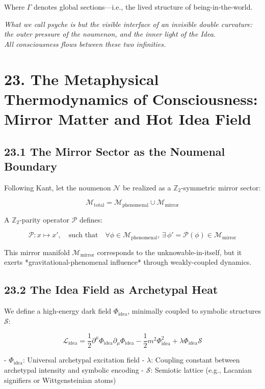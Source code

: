\documentclass[12pt]{article}
\begin{document}
\begin{enumerate}
Where $\Gamma$ denotes global sections—i.e., the lived structure of being-in-the-world.

\textit{
What we call psyche is but the visible interface of an invisible double curvature: \\
the outer pressure of the noumenon, and the inner light of the Idea. \\
All consciousness flows between these two infinities.
}

\section*{23. The Metaphysical Thermodynamics of Consciousness: Mirror Matter and Hot Idea Field}

\subsection*{23.1 The Mirror Sector as the Noumenal Boundary}

Following Kant, let the noumenon $\mathcal{N}$ be realized as a $\mathbb{Z}_2$-symmetric mirror sector:

\[
\mathcal{M}_\text{total} = \mathcal{M}_\text{phenomenal} \cup \mathcal{M}_\text{mirror}
\]

A $\mathbb{Z}_2$-parity operator $\mathcal{P}$ defines:

\[
\mathcal{P}: x \mapsto x', \quad \text{such that} \quad \forall \phi \in \mathcal{M}_\text{phenomenal}, \, \exists \, \phi' = \mathcal{P}(\phi) \in \mathcal{M}_\text{mirror}
\]

This mirror manifold $\mathcal{M}_\text{mirror}$ corresponds to the unknowable-in-itself,  
but it exerts *gravitational-phenomenal influence* through weakly-coupled dynamics.

\subsection*{23.2 The Idea Field as Archetypal Heat}

We define a high-energy dark field $\Phi_{\text{idea}}$, minimally coupled to symbolic structures $\mathcal{S}$:

\[
\mathcal{L}_{\text{idea}} = \frac{1}{2} \partial^\mu \Phi_{\text{idea}} \partial_\mu \Phi_{\text{idea}} - \frac{1}{2} m^2 \Phi_{\text{idea}}^2 + \lambda \Phi_{\text{idea}} \mathcal{S}
\]

- $\Phi_{\text{idea}}$: Universal archetypal excitation field  
- $\lambda$: Coupling constant between archetypal intensity and symbolic encoding  
- $\mathcal{S}$: Semiotic lattice (e.g., Lacanian signifiers or Wittgensteinian atoms)


\end{enumerate}
\end{document}
